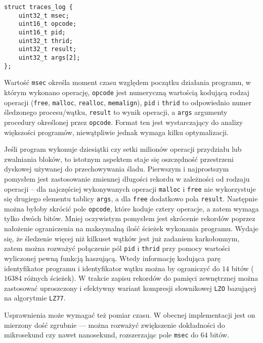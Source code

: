 \documentclass[12pt,a4paper,titlepage,twoside]{mwart}
\begin{document}
\vspace{1ex}

\begin{lstlisting}[caption={Struktura śladu.}]
struct traces_log {
    uint32_t msec;
    uint16_t opcode;
    uint16_t pid;
    uint32_t thrid;
    uint32_t result;
    uint32_t args[2];
};
\end{lstlisting}

\vspace{-1ex}

Wartość \texttt{msec} określa moment czasu względem początku działania
programu, w którym wykonano operację, \texttt{opcode} jest numeryczną wartością
kodującą rodzaj operacji (\texttt{free}, \texttt{malloc}, \texttt{realloc},
\texttt{memalign}), \texttt{pid} i \texttt{thrid} to odpowiednio numer
śledzonego procesu/wątku, \texttt{result} to wynik operacji, a \texttt{args}
argumenty procedury określonej przez \texttt{opcode}. Format ten jest
wystarczający do analizy większości programów, niewątpliwie jednak wymaga kilku
optymalizacji.

Jeśli program wykonuje dziesiątki czy setki milionów operacji przydziału lub
zwalniania bloków, to istotnym aspektem staje się oszczędność przestrzeni
dyskowej używanej do przechowywania śladu. Pierwszym i najprostszym pomysłem
jest zastosowanie zmiennej długości rekordu w zależności od rodzaju operacji --
dla najczęściej wykonywanych operacji \texttt{malloc} i \texttt{free} nie
wykorzystuje się drugiego elementu tablicy \texttt{args}, a dla \texttt{free}
dodatkowo pola \texttt{result}. Następnie można byłoby skrócić pole
\texttt{opcode}, które koduje cztery operacje, a zatem wymaga tylko dwóch
bitów. Mniej oczywistym pomysłem jest skrócenie rekordów poprzez nałożenie
ograniczenia na maksymalną ilość ścieżek wykonania programu. Wydaje się, że
śledzenie więcej niż kilkuset wątków jest już zadaniem karkołomnym, zatem można
rozważyć połączenie pól \texttt{pid} i \texttt{thrid} przy pomocy wartości
wyliczonej pewną funkcją haszującą. Wtedy informację kodująca parę
identyfikator programu i identyfikator wątku można by ograniczyć do $14$ bitów
($16384$ różnych ścieżek). W trakcie zapisu rekordów do pamięci zewnętrznej
można zastosować uproszczony i efektywny wariant kompresji słownikowej
\texttt{LZO} bazującej na algorytmie \texttt{LZ77}.

Usprawnienia może wymagać też pomiar czasu. W obecnej implementacji jest on
mierzony dość zgrubnie ---  można rozważyć zwiększenie dokładności do
mikrosekund czy nawet nanosekund, rozszerzając pole \texttt{msec} do $64$
bitów.
\end{document}
